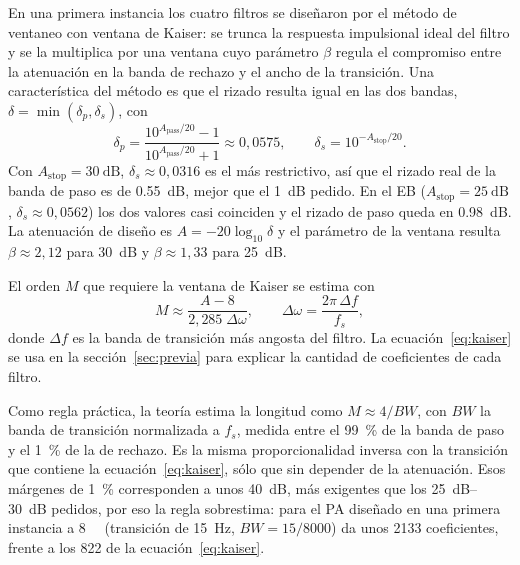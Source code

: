 \documentclass[11pt,a4paper]{article}
\begin{document}
En una primera instancia los cuatro filtros se diseñaron por el método de
ventaneo con ventana de Kaiser: se trunca la respuesta impulsional ideal del filtro y se la multiplica
por una ventana cuyo parámetro $\beta$ regula el compromiso entre la
atenuación en la banda de rechazo y el ancho de la transición. Una
característica del método es que el rizado resulta igual en las dos bandas,
$\delta = \min(\delta_p, \delta_s)$, con
\begin{equation}
  \delta_p = \frac{10^{A_{\text{pass}}/20} - 1}{10^{A_{\text{pass}}/20} + 1}
           \approx 0{,}0575,
  \qquad
  \delta_s = 10^{-A_{\text{stop}}/20}.
\end{equation}
Con $A_{\text{stop}} = \qty{30}{\deci\bel}$, $\delta_s \approx 0{,}0316$ es
el más restrictivo, así que el rizado real de la banda de paso es de
\qty{0.55}{\deci\bel}, mejor que el \qty{1}{\deci\bel} pedido. En el EB
($A_{\text{stop}} = \qty{25}{\deci\bel}$, $\delta_s \approx 0{,}0562$) los dos
valores casi coinciden y el rizado de paso queda en \qty{0.98}{\deci\bel}. La
atenuación de diseño es $A = -20\log_{10}\delta$ y el parámetro de la ventana
resulta $\beta \approx 2{,}12$ para \qty{30}{\deci\bel} y
$\beta \approx 1{,}33$ para \qty{25}{\deci\bel}.

El orden $M$ que requiere la ventana de Kaiser se estima con
\begin{equation}
  M \approx \frac{A - 8}{2{,}285\;\Delta\omega},
  \qquad \Delta\omega = \frac{2\pi\,\Delta f}{f_s},
  \label{eq:kaiser}
\end{equation}
donde $\Delta f$ es la banda de transición más angosta del filtro. La
ecuación~\eqref{eq:kaiser} se usa en la sección~\ref{sec:previa} para
explicar la cantidad de coeficientes de cada filtro.

Como regla práctica, la teoría estima la longitud como $M \approx 4/BW$, con $BW$
la banda de transición normalizada a $f_s$, medida entre el \qty{99}{\percent}
de la banda de paso y el \qty{1}{\percent} de la de rechazo. Es la misma
proporcionalidad inversa con la transición que contiene la
ecuación~\eqref{eq:kaiser}, sólo que sin depender de la atenuación. Esos
márgenes de \qty{1}{\percent} corresponden a unos \qty{40}{\deci\bel}, más
exigentes que los \qtyrange{25}{30}{\deci\bel} pedidos, por eso la regla
sobrestima: para el PA diseñado en una primera instancia a \qty{8}{\kilo\sps}
(transición de \qty{15}{\hertz}, $BW = 15/8000$) da unos \num{2133}
coeficientes, frente a los 822 de la ecuación~\eqref{eq:kaiser}.
\end{document}
